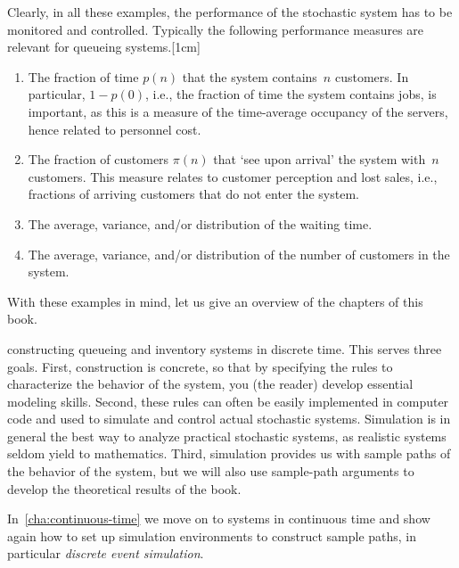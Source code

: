 \documentclass[stochastic-or.tex]{subfiles}
\begin{document}
Clearly, in all these examples, the performance of the stochastic system has to be monitored and controlled.
Typically the following performance measures are relevant for queueing systems.[1cm]
\begin{enumerate}
\item The fraction of time $p(n)$ that the system contains~$n$ customers.
 In particular, $1-p(0)$, i.e., the fraction of time the system contains jobs, is important, as this is a measure of the time-average occupancy of the servers, hence related to personnel cost.
\item The fraction of customers $\pi(n)$ that `see upon arrival' the system with~$n$ customers.
  This measure relates to customer perception and lost sales, i.e., fractions of arriving customers that do not enter the system.
\item The average, variance, and/or distribution of the waiting time.
\item The average, variance, and/or distribution of the number of customers in the system.\
\end{enumerate}


With these examples in mind, let us give an overview of the chapters of this book.

 constructing queueing and inventory systems in discrete time.
This serves three goals.
First, construction is concrete, so that by specifying the rules to characterize the behavior of the system, you (the reader) develop essential modeling skills.
Second, these rules can often be easily implemented in computer code and used to simulate and control actual stochastic systems.
Simulation is in general the best way to analyze practical stochastic systems, as realistic systems seldom yield to mathematics.
Third, simulation provides us with sample paths of the behavior of the system, but we will also use sample-path arguments to develop the theoretical results of  the book.

In~\cref{cha:continuous-time} we move on to systems in continuous time and show again how to set up simulation environments to construct sample paths, in particular  \emph{discrete event simulation}.
\end{document}
